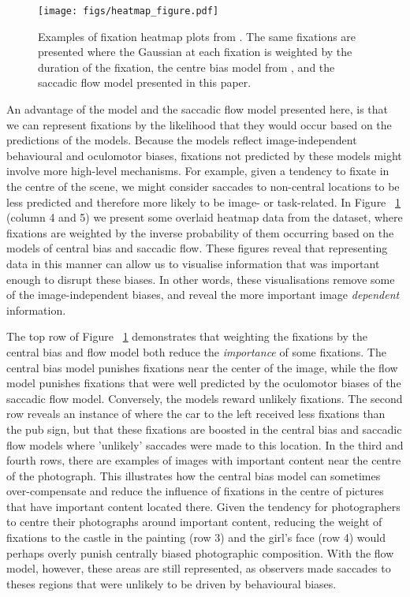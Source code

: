 \begin{figure}
\centering
\texttt{[image: figs/heatmap\_figure.pdf]}
\caption{Examples of fixation heatmap plots from \cite{clarke2013}. The same fixations are presented where the Gaussian at each fixation is weighted by the duration of the fixation, the centre bias model from \cite{clarke-tatler2014} , and the saccadic flow model presented in this paper.}
\label{fig:adjustedHeatmaps}
\end{figure}

An advantage of the \citet{clarke-tatler2014} model and the saccadic flow model presented here, is that we can represent fixations by the likelihood that they would occur based on the predictions of the models. Because the models reflect image-independent behavioural and oculomotor biases, fixations not predicted by these models might involve more high-level mechanisms. For example, given a tendency to fixate in the centre of the scene, we might consider saccades to non-central locations to be less predicted and therefore more likely to be image- or task-related.  In Figure ~\ref{fig:adjustedHeatmaps} (column 4 and 5) we present some overlaid heatmap data from the \citet{clarke2013} dataset, where fixations are weighted by the inverse probability of them occurring based on the models of central bias and saccadic flow. These figures reveal that representing data in this manner can allow us to visualise information that was important enough to disrupt these biases. In other words, these visualisations  remove some of the image-independent biases, and reveal the more important image \emph{dependent} information.


The top row of Figure ~\ref{fig:adjustedHeatmaps} demonstrates that weighting the fixations by the central bias and flow model both reduce the \emph{importance} of some fixations. The central bias model punishes fixations near the center of the image, while the flow model punishes fixations that were well predicted by the oculomotor biases of the saccadic flow model. Conversely, the models reward unlikely fixations. The second row reveals an instance of where the car to the left received less fixations than the pub sign, but that these fixations are boosted in the central bias and saccadic flow models where 'unlikely' saccades were made to this location. In the third and fourth rows, there are examples of images with important content near the centre of the photograph. This illustrates how the central bias model can sometimes over-compensate and reduce the influence of fixations in the centre of pictures that have important content located there. Given the tendency for photographers to centre their photographs around important content, reducing the weight of fixations to the castle in the painting (row 3) and the girl's face (row 4) would perhaps overly punish centrally biased photographic composition. With the flow model, however, these areas are still represented, as observers made saccades to theses regions that were unlikely to be driven by behavioural biases.

